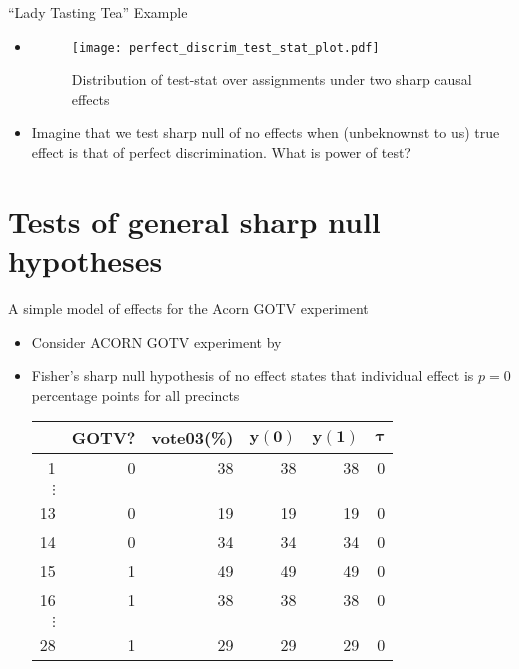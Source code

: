 \documentclass[table, xcolor = {dvipsnames}, 9pt]{beamer}
\theoremstyle{plain}
\begin{document}
\begin{frame}{``Lady Tasting Tea'' Example}
\vfill
\begin{itemize}
\item[]
\begin{figure}[H]
\texttt{[image: perfect\_discrim\_test\_stat\_plot.pdf]}
\caption{Distribution of test-stat over assignments under two sharp causal effects}
\end{figure} \vfill
\item Imagine that we test sharp null of no effects when (unbeknownst to us) true effect is that of perfect discrimination. What is power of test?
\end{itemize}  
\end{frame}
\section{Tests of general sharp null hypotheses}
\begin{frame}{A simple model of effects for the Acorn GOTV experiment}
\vfill
\begin{itemize}
\item Consider ACORN GOTV experiment by \citet{arceneaux2005} \vfill
\item Fisher's sharp null hypothesis of no effect states that individual effect is $p = 0$ percentage points for all precincts \vfill 
\begin{table}
  \begin{tabular}{r|rr|rrr}
  \hline
 & GOTV? & vote03(\%)& $\bm{y}(\bm{0})$ & $\bm{y}(\bm{1})$ & $\bm{\tau}$\\
  \hline
1 & 0 & 38 & 38 & 38 & 0 \\
$\vdots$& & & & & \\
13 & 0 & 19 & 19 & 19 & 0 \\
14 & 0 & 34 & 34 & 34 & 0 \\
15 & 1 & 49 & 49 & 49 & 0 \\
16 & 1 & 38 & 38 & 38 & 0 \\
$\vdots$& & & & & \\
28 & 1 & 29 & 29 & 29 & 0 \\
   \hline
\end{tabular}
\end{table}
\end{itemize}  
\end{frame}
\end{document}
